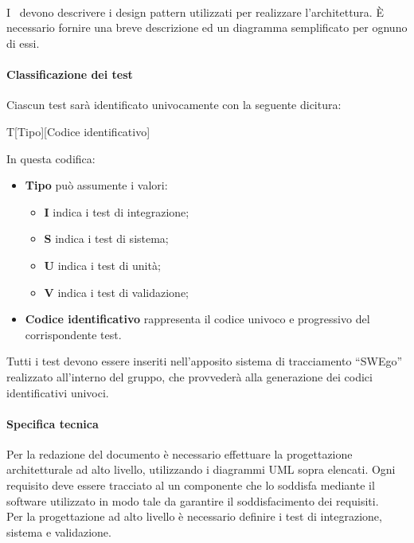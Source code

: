 \documentclass[../NormeDiProgetto.tex]{subfiles}
\begin{document}
			\paragraph{\\}
				I \progettisti\ devono descrivere i design pattern utilizzati per realizzare l'architettura.
				È necessario fornire una breve descrizione ed un diagramma semplificato per ognuno di essi.
			\paragraph{Classificazione dei test\\}
				Ciascun test sarà identificato univocamente con la seguente dicitura:
				\begin{center}
					T[Tipo][Codice identificativo]
				\end{center}
				In questa codifica:
				\begin{itemize}
					\item \textbf{Tipo} può assumente i valori:
					\begin{itemize}
						\item \textbf{I} indica i test di integrazione;
						\item \textbf{S} indica i test di sistema;
						\item \textbf{U} indica i test di unità;
						\item \textbf{V} indica i test di validazione;
					\end{itemize}
					\item \textbf{Codice identificativo} rappresenta il codice univoco e progressivo del
					corrispondente test.
				\end{itemize}
				Tutti i test devono essere inseriti nell'apposito sistema di tracciamento ``SWEgo''
				realizzato all'interno del gruppo, che provvederà alla generazione
				dei codici identificativi univoci.
			\paragraph{Specifica tecnica\\}
				Per la redazione del documento è necessario effettuare la progettazione architetturale ad
				alto livello, utilizzando i diagrammi UML sopra elencati. Ogni requisito deve essere tracciato
				al un componente che lo soddisfa mediante il software utilizzato in modo tale da garantire
				il soddisfacimento dei requisiti.\\
				Per la progettazione ad alto livello è necessario definire i test di integrazione, sistema e
				validazione.
\end{document}
